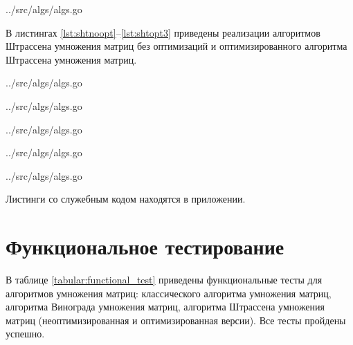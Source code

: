 \pagebreak

\begin{lstinputlisting}[
	caption={Оптимизированный алгоритм Винограда умножения матриц},
	label={lst:gropt},
	style={go},
	linerange={196-236},
	]{../src/algs/algs.go}
\end{lstinputlisting}
\pagebreak

В листингах \ref{lst:shtnoopt}--\ref{lst:shtopt3} приведены реализации алгоритмов Штрассена умножения матриц без оптимизаций и оптимизированного алгоритма Штрассена умножения матриц.

\begin{lstinputlisting}[
	caption={Алгоритм Штрассена умножения матриц без оптимизаций},
	label={lst:shtnoopt},
	style={go},
	linerange={361-402},
	]{../src/algs/algs.go}
\end{lstinputlisting}

\begin{lstinputlisting}[
	caption={Продолжение листинга \ref{lst:shtnoopt}},
	label={lst:shtnoopt2},
	style={go},
	linerange={403-432},
	]{../src/algs/algs.go}
\end{lstinputlisting}

\begin{lstinputlisting}[
	caption={Оптимизированный алгоритм Штрассена умножения матриц},
	label={lst:shtopt},
	style={go},
	linerange={434-445},
	]{../src/algs/algs.go}
\end{lstinputlisting}

\begin{lstinputlisting}[
	caption={Продолжение листинга \ref{lst:shtopt}},
	label={lst:shtopt2},
	style={go},
	linerange={446-492},
	]{../src/algs/algs.go}
\end{lstinputlisting}

\begin{lstinputlisting}[
	caption={Продолжение листинга \ref{lst:shtopt2}},
	label={lst:shtopt3},
	style={go},
	linerange={493-499},
	]{../src/algs/algs.go}
\end{lstinputlisting}

Листинги со служебным кодом находятся в приложении.

\section{Функциональное тестирование}

В таблице \ref{tabular:functional_test} приведены функциональные тесты для алгоритмов умножения матриц: классического алгоритма умножения матриц, алгоритма Винограда умножения матриц, алгоритма Штрассена умножения матриц (неоптимизированная и оптимизированная версии). Все тесты пройдены успешно.

